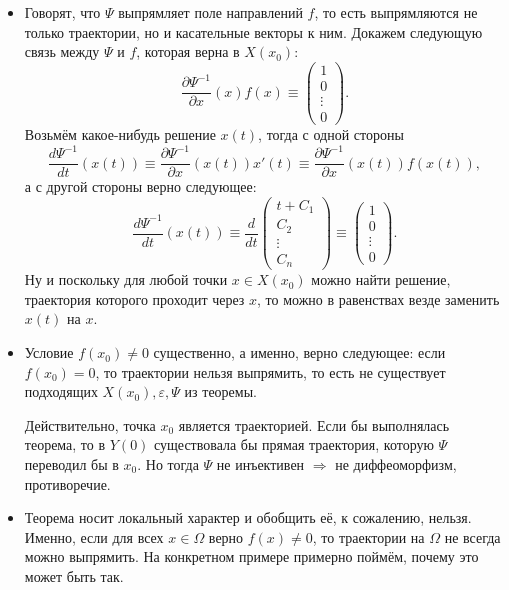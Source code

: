 \begin{itemize}
    \item Говорят, что $\Psi$ выпрямляет поле направлений $f$, то есть выпрямляются не только траектории, но и касательные векторы к ним. Докажем следующую связь между $\Psi$ и $f$, которая верна в $X(x_0)$:
    \[
        \frac{\partial \Psi^{-1}}{\partial x}(x) f(x) \equiv \begin{pmatrix}
            1\\
            0\\
            \vdots \\
            0
        \end{pmatrix}.
    \]
    Возьмём какое-нибудь решение $x(t)$, тогда с одной стороны
    \[
        \frac{d \Psi^{-1}}{dt}(x(t)) \equiv \frac{\partial \Psi^{-1}}{\partial x}(x(t))x'(t) \equiv \frac{\partial \Psi^{-1}}{\partial x}(x(t))f(x(t)),
    \]
    а с другой стороны верно следующее:
    \[
        \frac{d \Psi^{-1}}{dt}(x(t)) \equiv \frac{d}{dt} \begin{pmatrix}
            t + C_1\\
            C_2\\
            \vdots\\
            C_n
        \end{pmatrix} \equiv \begin{pmatrix}
            1\\
            0\\
            \vdots\\
            0
        \end{pmatrix}.
    \]
    Ну и поскольку для любой точки $x \in X(x_0)$ можно найти решение, траектория которого проходит через $x$, то можно в равенствах везде заменить $x(t)$ на $x$.
    \item Условие $f(x_0) \ne 0$ существенно, а именно, верно следующее: если $f(x_0) = 0$, то траектории нельзя выпрямить, то есть не существует подходящих $X(x_0), \varepsilon, \Psi$ из теоремы.
    
    Действительно, точка $x_0$ является траекторией. Если бы выполнялась теорема, то в $Y(0)$ существовала бы прямая траектория, которую $\Psi$ переводил бы в $x_0$. Но тогда $\Psi$ не инъективен $\Rightarrow$ не диффеоморфизм, противоречие.
    \item Теорема носит локальный характер и обобщить её, к сожалению, нельзя. Именно, если для всех $x \in \Omega$ верно $f(x) \ne 0$, то траектории на $\Omega$ не всегда можно выпрямить. На конкретном примере примерно поймём, почему это может быть так.
    

\end{itemize}
